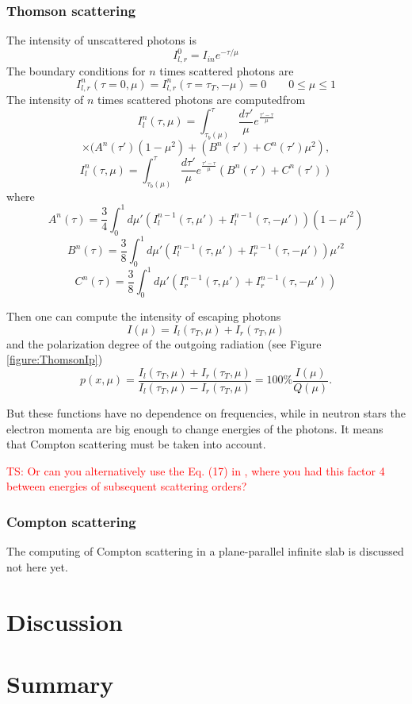 \documentclass{aa}
\newcommand{\be}{\begin{equation}}
\newcommand{\ee}{\end{equation}}
\newcommand{\red}[1]{\textcolor{red}{#1}}
\begin{document}
\subsubsection{Thomson scattering}
The intensity of unscattered photons is
\be
I_{l,r}^0=I_{in}e^{-\tau/\mu}
\ee
The boundary conditions for $n$ times scattered photons are
\be
I_{l,r}^n(\tau=0,\mu)=I_{l,r}^n(\tau=\tau_T,-\mu)=0\qquad 0\leq\mu\leq1
\ee
The intensity of $n$ times scattered photons are computedfrom
$$
I_l^n(\tau,\mu)=\int_{\tau_b(\mu)}^\tau \frac{d\tau'}\mu e^{\frac{\tau'-\tau}\mu}$$
\be
\times( A^n(\tau')(1-\mu^2) + (B^n(\tau')+C^n(\tau')\mu^2 ),
\ee
$$
I_l^n(\tau,\mu)=\int_{\tau_b(\mu)}^\tau \frac{d\tau'}\mu e^{\frac{\tau'-\tau}\mu}
(B^n(\tau')+C^n(\tau'))
$$
where $$
A^n(\tau)=\frac34\int_0^1 d\mu' (I^{n-1}_l (\tau,\mu')+I^{n-1}_l (\tau,-\mu')) (1-\mu'^2)
$$
\be
B^n(\tau)=\frac38\int_0^1 d\mu' (I^{n-1}_l (\tau,\mu')+I^{n-1}_r (\tau,-\mu'))\mu'^2
\ee
$$
C^n(\tau)=\frac38\int_0^1 d\mu' (I^{n-1}_r (\tau,\mu')+I^{n-1}_r (\tau,-\mu')) 
$$

Then one can compute the intensity of escaping photons\be
I(\mu)=I_l(\tau_T,\mu)+I_r(\tau_T,\mu)
\ee
and the polarization degree of the outgoing radiation (see Figure \ref{figure:ThomsonIp})
\be
p(x,\mu)
=\frac{I_l(\tau_T,\mu)+I_r(\tau_T,\mu)}{I_l(\tau_T,\mu)-I_r(\tau_T,\mu)}
=100\%\frac{I(\mu)}{Q(\mu)}.\ee



But these functions have no dependence on frequencies, while in neutron stars the electron momenta are big enough to change energies of the photons. It means that Compton scattering must be taken into account.

\red{TS:
Or can you alternatively use the Eq. (17) in \citet{VP04}, where you had this factor 4 between energies of subsequent scattering orders?
}

\subsubsection{Compton scattering}
The computing of Compton scattering in a plane-parallel infinite slab is discussed  not here yet.


\section{Discussion}

\section{Summary}
\end{document}
